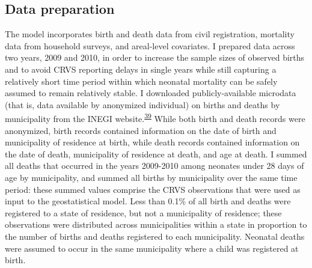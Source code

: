 \documentclass[
]{article}
\begin{document}
\hypertarget{data-preparation}{%
\subsection{Data preparation}\label{data-preparation}}

The model incorporates birth and death data from civil registration, mortality data from household surveys, and areal-level covariates. I prepared data across two years, 2009 and 2010, in order to increase the sample sizes of observed births and to avoid CRVS reporting delays in single years while still capturing a relatively short time period within which neonatal mortality can be safely assumed to remain relatively stable. I downloaded publicly-available microdata (that is, data available by anonymized individual) on births and deaths by municipality from the INEGI website.\textsuperscript{\protect\hyperlink{ref-INEGI2010}{39}} While both birth and death records were anonymized, birth records contained information on the date of birth and municipality of residence at birth, while death records contained information on the date of death, municipality of residence at death, and age at death. I summed all deaths that occurred in the years 2009-2010 among neonates under 28 days of age by municipality, and summed all births by municipality over the same time period: these summed values comprise the CRVS observations that were used as input to the geostatistical model. Less than 0.1\% of all birth and deaths were registered to a state of residence, but not a municipality of residence; these observations were distributed across municipalities within a state in proportion to the number of births and deaths registered to each municipality. Neonatal deaths were assumed to occur in the same municipality where a child was registered at birth.
\end{document}
